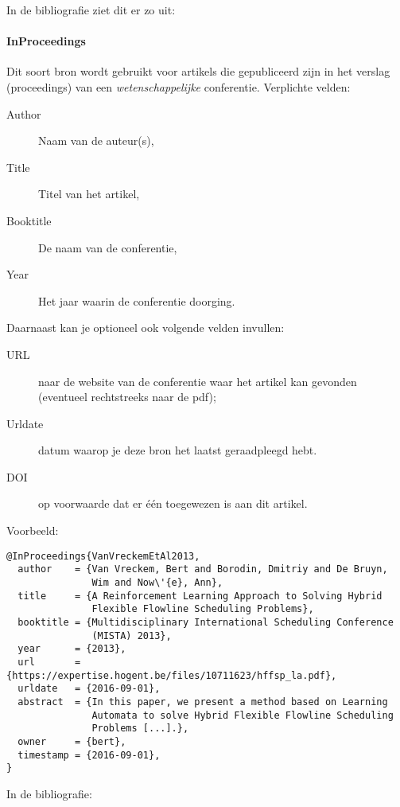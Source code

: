 In de bibliografie ziet dit er zo uit: 

\paragraph{InProceedings}

Dit soort bron wordt gebruikt voor artikels die gepubliceerd zijn in het verslag (proceedings) van een \emph{wetenschappelijke} conferentie. Verplichte velden:

\begin{description}
  \item[Author] Naam van de auteur(s),
  \item[Title] Titel van het artikel,
  \item[Booktitle] De naam van de conferentie,
  \item[Year] Het jaar waarin de conferentie doorging.
\end{description}

Daarnaast kan je optioneel ook volgende velden invullen:

\begin{description}
  \item[URL] naar de website van de conferentie waar het artikel kan gevonden (eventueel rechtstreeks naar de pdf);
  \item[Urldate] datum waarop je deze bron het laatst geraadpleegd hebt.
  \item[DOI] op voorwaarde dat er één toegewezen is aan dit artikel.
\end{description}

Voorbeeld:
\begin{verbatim}
@InProceedings{VanVreckemEtAl2013,
  author    = {Van Vreckem, Bert and Borodin, Dmitriy and De Bruyn,
               Wim and Now\'{e}, Ann},
  title     = {A Reinforcement Learning Approach to Solving Hybrid
               Flexible Flowline Scheduling Problems},
  booktitle = {Multidisciplinary International Scheduling Conference
               (MISTA) 2013},
  year      = {2013},
  url       = {https://expertise.hogent.be/files/10711623/hffsp_la.pdf},
  urldate   = {2016-09-01},
  abstract  = {In this paper, we present a method based on Learning
               Automata to solve Hybrid Flexible Flowline Scheduling 
               Problems [...].},
  owner     = {bert},
  timestamp = {2016-09-01},
}
\end{verbatim}

In de bibliografie: 

